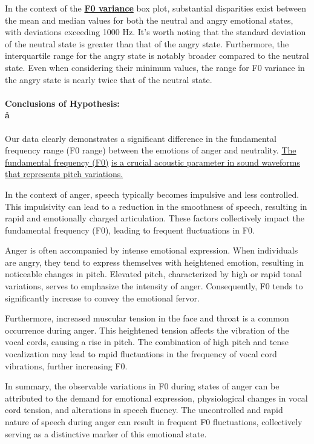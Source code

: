 \documentclass{../labbook}
\begin{document}
\begin{solution}
In the context of the \underline{\textbf{F0 variance}} box plot, substantial disparities exist between the mean and median values for both the neutral and angry emotional states, with deviations exceeding 1000 Hz. It's worth noting that the standard deviation of the neutral state is greater than that of the angry state. Furthermore, the interquartile range for the angry state is notably broader compared to the neutral state. Even when considering their minimum values, the range for F0 variance in the angry state is nearly twice that of the neutral state.

\paragraph{Conclusions of Hypothesis:\\å}

Our data clearly demonstrates a significant difference in the fundamental frequency range (F0 range) between the emotions of anger and neutrality. \underline{The fundamental frequency (F0)} \underline{is a crucial acoustic parameter in sound waveforms that represents pitch variations.}

In the context of anger, speech typically becomes impulsive and less controlled. This impulsivity can lead to a reduction in the smoothness of speech, resulting in rapid and emotionally charged articulation. These factors collectively impact the fundamental frequency (F0), leading to frequent fluctuations in F0.

Anger is often accompanied by intense emotional expression. When individuals are angry, they tend to express themselves with heightened emotion, resulting in noticeable changes in pitch. Elevated pitch, characterized by high or rapid tonal variations, serves to emphasize the intensity of anger. Consequently, F0 tends to significantly increase to convey the emotional fervor.

Furthermore, increased muscular tension in the face and throat is a common occurrence during anger. This heightened tension affects the vibration of the vocal cords, causing a rise in pitch. The combination of high pitch and tense vocalization may lead to rapid fluctuations in the frequency of vocal cord vibrations, further increasing F0.

In summary, the observable variations in F0 during states of anger can be attributed to the demand for emotional expression, physiological changes in vocal cord tension, and alterations in speech fluency. The uncontrolled and rapid nature of speech during anger can result in frequent F0 fluctuations, collectively serving as a distinctive marker of this emotional state.
\end{solution}
\end{document}
